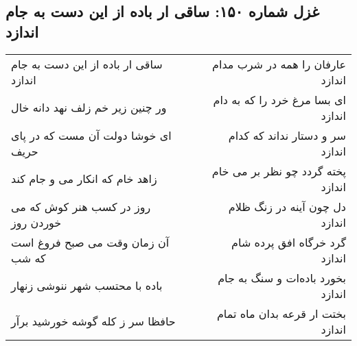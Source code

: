 \begin{center}
\section*{غزل شماره ۱۵۰: ساقی ار باده از این دست به جام اندازد}
\label{sec:sh150}
\begin{longtable}{l p{0.5cm} r}
ساقی ار باده از این دست به جام اندازد
&&
عارفان را همه در شرب مدام اندازد
\\
ور چنین زیر خم زلف نهد دانه خال
&&
ای بسا مرغ خرد را که به دام اندازد
\\
ای خوشا دولت آن مست که در پای حریف
&&
سر و دستار نداند که کدام اندازد
\\
زاهد خام که انکار می و جام کند
&&
پخته گردد چو نظر بر می خام اندازد
\\
روز در کسب هنر کوش که می خوردن روز
&&
دل چون آینه در زنگ ظلام اندازد
\\
آن زمان وقت می صبح فروغ است که شب
&&
گرد خرگاه افق پرده شام اندازد
\\
باده با محتسب شهر ننوشی زنهار
&&
بخورد باده‌ات و سنگ به جام اندازد
\\
حافظا سر ز کله گوشه خورشید برآر
&&
بختت ار قرعه بدان ماه تمام اندازد
\\
\end{longtable}
\end{center}

